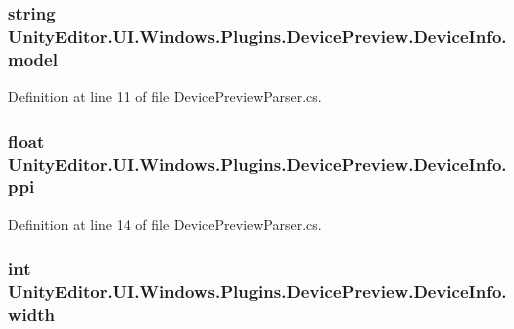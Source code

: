\subsubsection[{model}]{\setlength{\rightskip}{0pt plus 5cm}string Unity\+Editor.\+U\+I.\+Windows.\+Plugins.\+Device\+Preview.\+Device\+Info.\+model}\label{class_unity_editor_1_1_u_i_1_1_windows_1_1_plugins_1_1_device_preview_1_1_device_info_a9514b0ca0fdae6ed0259899aa6577d5e}


Definition at line 11 of file Device\+Preview\+Parser.\+cs.

\hypertarget{class_unity_editor_1_1_u_i_1_1_windows_1_1_plugins_1_1_device_preview_1_1_device_info_a90b553795912b22a4cd43415202b2aff}{}
\subsubsection[{ppi}]{\setlength{\rightskip}{0pt plus 5cm}float Unity\+Editor.\+U\+I.\+Windows.\+Plugins.\+Device\+Preview.\+Device\+Info.\+ppi}\label{class_unity_editor_1_1_u_i_1_1_windows_1_1_plugins_1_1_device_preview_1_1_device_info_a90b553795912b22a4cd43415202b2aff}


Definition at line 14 of file Device\+Preview\+Parser.\+cs.

\hypertarget{class_unity_editor_1_1_u_i_1_1_windows_1_1_plugins_1_1_device_preview_1_1_device_info_a527516d0f91180a86020b16c3777313c}{}
\subsubsection[{width}]{\setlength{\rightskip}{0pt plus 5cm}int Unity\+Editor.\+U\+I.\+Windows.\+Plugins.\+Device\+Preview.\+Device\+Info.\+width}\label{class_unity_editor_1_1_u_i_1_1_windows_1_1_plugins_1_1_device_preview_1_1_device_info_a527516d0f91180a86020b16c3777313c}


